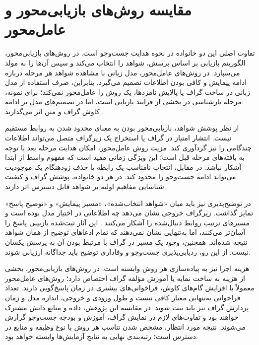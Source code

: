 \section{مقایسه روش‌های بازیابی‌محور و عامل‌محور}

تفاوت اصلی این دو خانواده در نحوه هدایت جست‌وجو است. در روش‌های بازیابی‌محور، الگوریتم بازیابی بر اساس پرسش، شواهد را انتخاب می‌کند و سپس آن‌ها را به مولد می‌سپارد. در روش‌های عامل‌محور، مدل زبانی با مشاهده شواهد هر مرحله درباره ادامه پیمایش و کافی بودن اطلاعات تصمیم می‌گیرد. بنابراین، صرف استفاده از مدل زبانی در ساخت گراف یا پالایش نامزدها، یک روش را عامل‌محور نمی‌کند؛ برای نمونه، مرحله بازشناسی در  بخشی از فرایند بازیابی است، اما در  تصمیم‌های مدل بر ادامه کاوش گراف و متن اثر می‌گذارند \cite{gutierrez2025hipporag2,ma2025tog2}.

از نظر پوشش شواهد، بازیابی‌محور بودن به معنای محدود شدن به روابط مستقیم نیست. انتشار امتیاز در گراف یا استخراج یک زیرگراف متصل می‌تواند اطلاعات چندگامی را نیز گردآوری کند. مزیت روش عامل‌محور، امکان هدایت مرحله بعد با توجه به یافته‌های مرحله قبل است؛ این ویژگی زمانی مفید است که مفهوم واسط از ابتدا آشکار نباشد. در مقابل، انتخاب نامناسب یک رابطه یا حذف زودهنگام یک موجودیت می‌تواند ادامه جست‌وجو را محدود کند. در هر دو خانواده، پوشش گراف و کیفیت شناسایی مفاهیم اولیه بر شواهد قابل دسترس اثر دارند.

در توضیح‌پذیری نیز باید میان «شواهد انتخاب‌شده»، «مسیر پیمایش» و «توضیح پاسخ» تمایز گذاشت. زیرگراف خروجی  نشان می‌دهد چه اطلاعاتی در اختیار مدل بوده است و مسیرهای  ترتیب روابط دنبال‌شده را آشکار می‌کنند \cite{he2024gretriever,sun2024think}. این آثار ثبت‌شده بازبینی پاسخ را آسان‌تر می‌کنند، اما به‌تنهایی نشان نمی‌دهند که تمام ادعاهای توضیح از همان شواهد نتیجه شده‌اند. همچنین، وجود یک مسیر در گراف با مرتبط بودن آن به پرسش یکسان نیست. از این رو، ردیابی‌پذیری جست‌وجو و وفاداری توضیح باید جداگانه ارزیابی شوند.

هزینه اجرا نیز به پیاده‌سازی هر روش وابسته است. در روش‌های بازیابی‌محور، بخشی از هزینه به ساخت نمایه یا آموزش مؤلفه گراف اختصاص دارد؛ روش‌های عامل‌محور معمولاً با افزایش گام‌های کاوش، فراخوانی‌های بیشتری در زمان پاسخ‌گویی دارند. تعداد فراخوانی به‌تنهایی معیار کافی نیست و طول ورودی و خروجی، اندازه مدل و زمان پردازش گراف نیز باید ثبت شوند. در مقایسه این پژوهش، داده و منابع دانش مشترک خواهند بود و تفاوت‌های لازم در نمایش گراف، آموزش و بودجه جست‌وجو گزارش می‌شوند. نتیجه مورد انتظار، مشخص شدن تناسب هر روش با نوع وظیفه و منابع در دسترس است؛ رتبه‌بندی نهایی به نتایج آزمایش‌ها وابسته خواهد بود.

